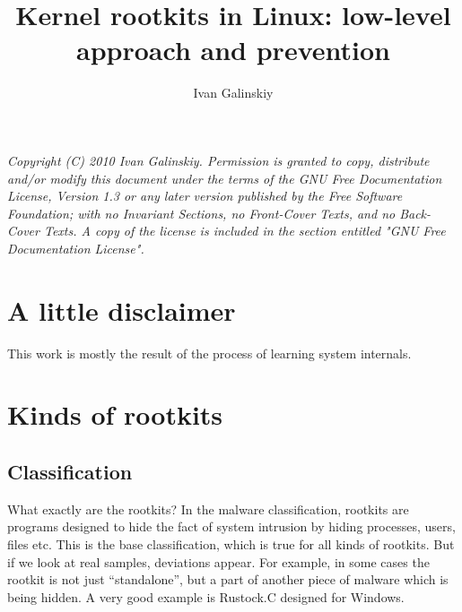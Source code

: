 \documentclass[12pt]{article}
\title{Kernel rootkits in Linux: low-level approach and prevention}
\date{}
\author{Ivan Galinskiy}
\begin{document}
\maketitle
  \emph{
  Copyright (C) 2010 Ivan Galinskiy.
    Permission is granted to copy, distribute and/or modify this document
    under the terms of the GNU Free Documentation License, Version 1.3
    or any later version published by the Free Software Foundation;
    with no Invariant Sections, no Front-Cover Texts, and no Back-Cover Texts.
    A copy of the license is included in the section entitled "GNU
    Free Documentation License".}

  \section{A little disclaimer}

  This work is mostly the result of the process of learning
  system internals.
  
  \section{Kinds of rootkits}
  \subsection{Classification}
  What exactly are the rootkits? In the malware classification, rootkits are
  programs designed to hide the fact of system intrusion by hiding processes,
  users, files etc. This is the base classification, which is true for all
  kinds of rootkits. But if we look at real samples, deviations appear. For
  example, in some cases the rootkit is not just ``standalone'', but a part of
  another piece of malware which is being hidden. A very good example is
  Rustock.C designed for Windows.
\end{document}
